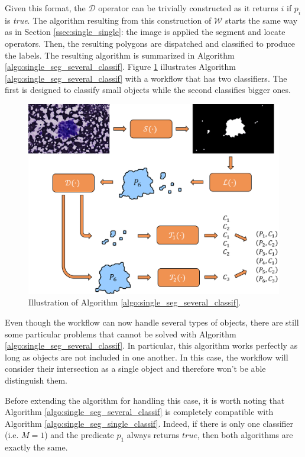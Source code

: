 Given this format, the $\mathcal{D}$ operator can be trivially constructed as it returns $i$ if $p_i$ is \textit{true}. The algorithm resulting from this construction of $\mathcal{W}$ starts the same way as in Section \ref{ssec:single_single}: the image is applied the segment and locate operators. Then, the resulting polygons are dispatched and classified to produce the labels. The resulting algorithm is summarized in Algorithm \ref{algo:single_seg_several_classif}. Figure \ref{fig:workflow_illustration} illustrates Algorithm \ref{algo:single_seg_several_classif} with a workflow that has two classifiers. The first is designed to classify small objects while the second classifies bigger ones.

\begin{figure}
	\center
	\includegraphics[scale=0.75]{image/workflow_illustration.png}
	\caption{Illustration of Algorithm \ref{algo:single_seg_several_classif}.}
	\label{fig:workflow_illustration}
\end{figure} 

Even though the workflow can now handle several types of objects, there are still some particular problems that cannot be solved with Algorithm \ref{algo:single_seg_several_classif}. In particular, this algorithm works perfectly as long as objects are not included in one another. In this case, the workflow will consider their intersection as a single object and therefore won't be able distinguish them.

Before extending the algorithm for handling this case, it is worth noting that Algorithm \ref{algo:single_seg_several_classif} is completely compatible with Algorithm \ref{algo:single_seg_single_classif}. Indeed, if there is only one classifier (i.e. $M = 1$) and the predicate $p_1$ always returns $true$, then both algorithms are exactly the same. 

